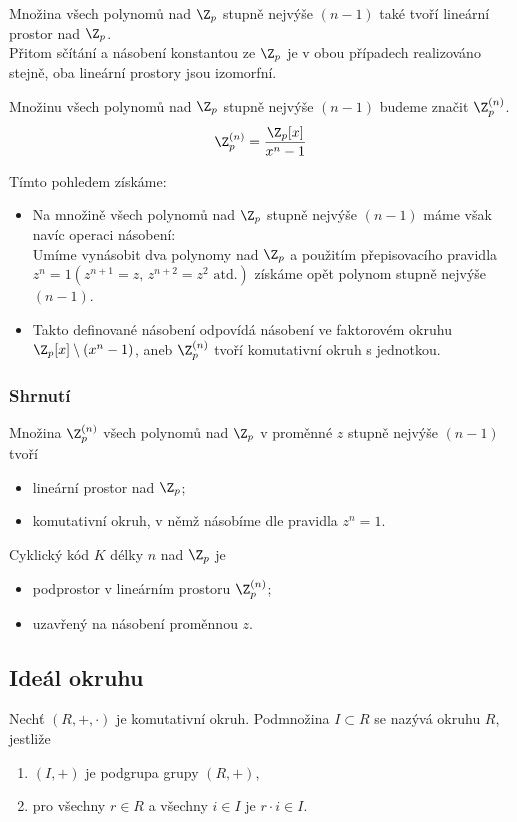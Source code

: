 Množina všech polynomů nad $\Z_p$ stupně nejvýše $(n-1)$ také tvoří lineární prostor nad $\Z_p$.\\
Přitom sčítání a násobení konstantou ze $\Z_p$ je v obou případech realizováno stejně, oba lineární prostory jsou izomorfní.

Množinu všech polynomů nad $\Z_p$ stupně nejvýše $(n-1)$ budeme značit $\Z_p^{(n)}$.
\begin{equation}
	\Z_p^{(n)} = \frac{\Z_p[x]}{x^n - 1}
\end{equation}

Tímto pohledem získáme:
\vspace{-1em}
\begin{itemize}
	\item Na množině všech polynomů nad $\Z_p$ stupně nejvýše $(n-1)$ máme však navíc operaci násobení:\\
	Umíme vynásobit dva polynomy nad $\Z_p$ a použitím přepisovacího pravidla $z^n = 1 (z^{n+1} = z, \, z^{n+2}=z^2 \text{ atd.})$ získáme opět polynom stupně nejvýše $(n-1)$.
	\item Takto definované násobení odpovídá násobení ve faktorovém okruhu $\Z_p[x] \setminus (x^n - 1)$, aneb $\Z_p^{(n)}$ tvoří komutativní okruh s jednotkou.
\end{itemize}
\vspace{-1em}
\subsubsection*{Shrnutí}
Množina $\Z_p^{(n)}$ všech polynomů nad $\Z_p$ v proměnné $z$ stupně nejvýše $(n-1)$ tvoří
\vspace{-1em}
\begin{itemize}
	\item lineární prostor nad $\Z_p$;
	\item komutativní okruh, v němž násobíme dle pravidla $z^n = 1$.
\end{itemize}
Cyklický kód $K$ délky $n$ nad $\Z_p$ je
\vspace{-1em}
\begin{itemize}
	\item podprostor v lineárním prostoru $\Z_p^{(n)}$;
	\item uzavřený na násobení proměnnou $z$.	
\end{itemize}

\subsection{Ideál okruhu}
Nechť $(R, +, \cdot)$ je komutativní okruh. Podmnožina $I \subset R$ se nazývá  okruhu $R$, jestliže
\vspace{-1em}
\begin{enumerate}
	\item $(I, +)$ je podgrupa grupy $(R, +)$,
	\item pro všechny $r \in R$ a všechny $i \in I$ je $r \cdot i \in I$.
\end{enumerate}

